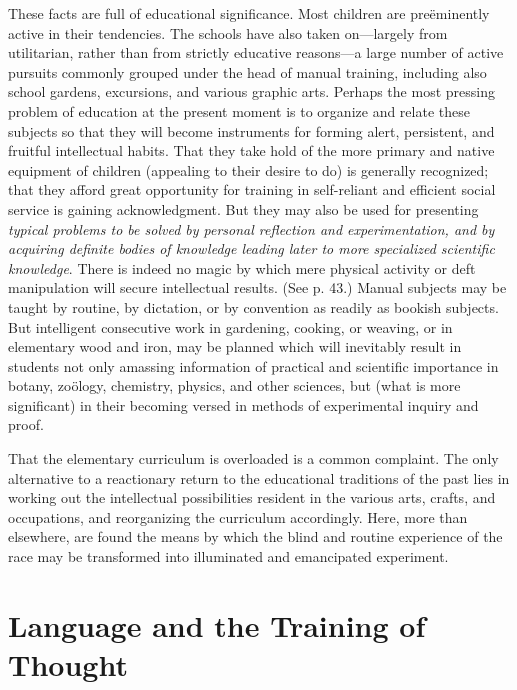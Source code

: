 \documentclass[letterpaper]{book}
\begin{document}

These facts are full of educational significance. Most children are
preëminently active in their tendencies. The schools have also taken
on---largely from utilitarian, rather than from strictly educative
reasons---a large number of active pursuits commonly grouped under the
head of manual training, including also school gardens, excursions, and
various graphic arts. Perhaps the most pressing problem of education at
the present moment is to organize and relate these subjects so that they
will become instruments for forming alert, persistent, and fruitful
intellectual habits. That they take hold of the more primary and native
equipment of children (appealing to their desire to do) is generally
recognized; that they afford great opportunity for training in
self-reliant and efficient social service is gaining acknowledgment. But
they may also be used for presenting \emph{typical problems to be solved
by personal reflection and experimentation, and by acquiring definite
bodies of knowledge leading later to more specialized scientific
knowledge}. There is indeed no magic by which mere physical activity or
deft manipulation will secure intellectual results. (See p. 43.) Manual
subjects may be taught by routine, by dictation, or by convention as
readily
as bookish subjects. But intelligent consecutive work in gardening,
cooking, or weaving, or in elementary wood and iron, may be planned
which will inevitably result in students not only amassing information
of practical and scientific importance in botany, zoölogy, chemistry,
physics, and other sciences, but (what is more significant) in their
becoming versed in methods of experimental inquiry and proof.


That the elementary curriculum is overloaded is a common complaint. The
only alternative to a reactionary return to the educational traditions
of the past lies in working out the intellectual possibilities resident
in the various arts, crafts, and occupations, and reorganizing the
curriculum accordingly. Here, more than elsewhere, are found the means
by which the blind and routine experience of the race may be transformed
into illuminated and emancipated
experiment.

\chapter{Language and the Training of Thought}
\end{document}
